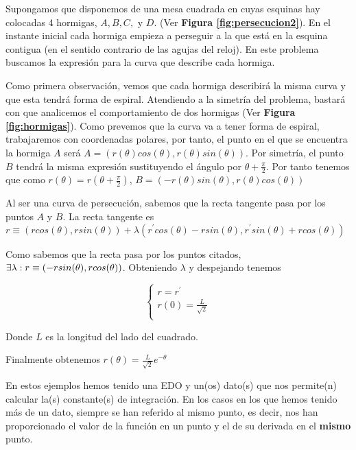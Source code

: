 \documentclass{mathnotes}
\begin{document}
\begin{example}
Supongamos que disponemos de una mesa cuadrada en cuyas esquinas hay colocadas 4 hormigas, $A, B, C,$ y $D$. (Ver \textbf{Figura \ref{fig:persecucion2}}). En el instante inicial cada hormiga empieza a perseguir a la que está en la esquina contigua (en el sentido contrario de las agujas del reloj). En este problema buscamos la expresión para la curva que describe cada hormiga.

Como primera observación, vemos que cada hormiga describirá la misma curva y que esta tendrá forma de espiral. Atendiendo a la simetría del problema, bastará con que analicemos el comportamiento de dos hormigas (Ver \textbf{Figura \ref{fig:hormigas}}). Como prevemos que la curva va a tener forma de espiral, trabajaremos con coordenadas polares, por tanto, el punto en el que se encuentra la hormiga $A$ será $A=(r(\theta)cos(\theta), r(\theta)sin(\theta))$. Por simetría, el punto $B$ tendrá la misma expresión sustituyendo el ángulo por $\theta+\frac{\pi}{2}$. Por tanto tenemos que como $r(\theta)=r(\theta+\frac{\pi}{2})$, $B=(-r(\theta)sin(\theta), r(\theta)cos(\theta))$

Al ser una curva de persecución, sabemos que la recta tangente pasa por los puntos $A$ y $B$. La recta tangente es $r\equiv (rcos(\theta), rsin(\theta))+\lambda(r^\prime cos(\theta)-rsin(\theta),r^\prime sin(\theta)+rcos(\theta))$

Como sabemos que la recta pasa por los puntos citados, $\exists \lambda : r\equiv (-rsin(\theta), rcos(\theta))$. Obteniendo $\lambda$ y despejando tenemos 

\begin{equation*}
  \left\lbrace
  \begin{array}{l}
     r = r^\prime \\
     r(0) = \frac{L}{\sqrt{2}}  \\
  \end{array}
  \right.
\end{equation*}

Donde $L$ es la longitud del lado del cuadrado.

Finalmente obtenemos $r(\theta) = \frac{L}{\sqrt{2}}e^{-\theta}$

\end{example}

En estos ejemplos hemos tenido una EDO y un(os) dato(s) que nos permite(n) calcular la(s) constante(s) de integración. En los casos en los que hemos tenido más de un dato, siempre se han referido al mismo punto, es decir, nos han proporcionado el valor de la función en un punto y el de su derivada en el \textbf{mismo} punto.
\end{document}
